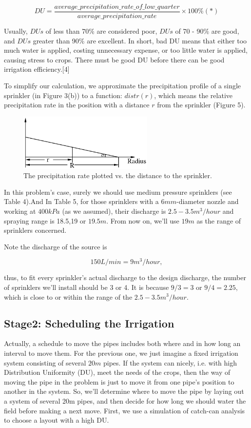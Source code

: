\documentclass[12pt,a4paper,titlepage]{article}
\begin{document}
\[
DU=\frac{\textit{average\_precipitation\_rate\_of\_low\_quarter}}{\textit{average\_precipitation\_rate}}\times100\%
(*)
\]


Usually, $DUs$ of less than 70\% are considered poor, $DUs$ of 70
- 90\% are good, and $DUs$ greater than 90\% are excellent. In
short, bad DU means that either too much water is applied, costing
unnecessary expense, or too little water is applied, causing
stress to crops. There must be good DU before there can be good
irrigation efficiency.[4]

To simplify our calculation, we approximate the precipitation
profile of a single sprinkler (in Figure 3(b)) to a function:
$distr(r)$, which means the relative precipitation rate in the
position with a distance $r$ from the sprinkler (Figure 5).

\begin{figure}[!htb]
\centering
\includegraphics[width=0.6\textwidth]{fig05.eps}
\caption{\label{fig05} The precipitation rate plotted vs. the
distance to the sprinkler.}
\end{figure}

In this problem's case, surely we should use medium pressure
sprinklers (see Table 4).And In Table 5, for those sprinklers with
a $6mm$-diameter nozzle and working at $400kPa$ (as we assumed),
their discharge is $2.5-3.5m^3/hour$ and spraying range is 18.5,19
or $19.5m$. From now on, we'll use $19m$ as the range of
sprinklers concerned.

Note the discharge of the source is

\[
150L/min=9m^3/hour,
\]

thus, to fit every sprinkler's actual discharge to the design
discharge, the number of sprinklers we'll install should be 3 or
4. It is because $9/3=3$ or $9/4=2.25$, which is close to or
within the range of the $2.5-3.5m^3/hour$.

\subsection{Stage2: Scheduling the Irrigation}

Actually, a schedule to move the pipes includes both where and in
how long an interval to move them. For the previous one, we just
imagine a fixed irrigation system consisting of several $20m$
pipes. If the system can nicely, i.e. with high Distribution
Uniformity (DU), meet the needs of the crops, then the way of
moving the pipe in the problem is just to move it from one pipe's
position to another in the system. So, we'll determine where to
move the pipe by laying out a system of several 20m pipes, and
then decide for how long we should water the field before making a
next move. First, we use a simulation of catch-can analysis to
choose a layout with a high DU.
\end{document}
